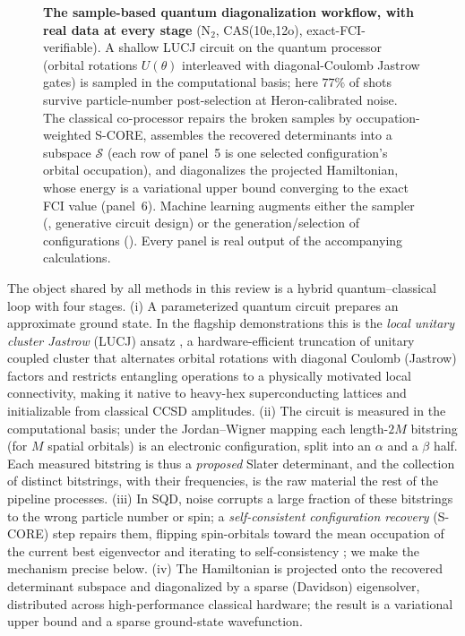 \documentclass[11pt]{article}
\newcommand{\ent}[1]{\raisebox{0.1ex}{\textcircled{\scriptsize #1}}}
\begin{document}
\begin{figure}[tb]
\caption{\textbf{The sample-based quantum diagonalization workflow, with real data at every stage} (N$_2$, CAS(10e,12o), exact-FCI-verifiable). A shallow LUCJ circuit on the quantum processor (orbital rotations $U(\theta)$ interleaved with diagonal-Coulomb Jastrow gates) is sampled in the computational basis; here $77\%$ of shots survive particle-number post-selection at Heron-calibrated noise. The classical co-processor repairs the broken samples by occupation-weighted S-CORE, assembles the recovered determinants into a subspace $\mathcal{S}$ (each row of panel~5 is one selected configuration's orbital occupation), and diagonalizes the projected Hamiltonian, whose energy is a variational upper bound converging to the exact FCI value (panel~6). Machine learning augments either the sampler (\ent{1}, generative circuit design) or the generation/selection of configurations (\ent{2}). Every panel is real output of the accompanying calculations.}
\label{fig:loop}
\end{figure}

The object shared by all methods in this review is a hybrid quantum--classical loop with four stages. (i) A parameterized quantum circuit prepares an approximate ground state. In the flagship demonstrations this is the \emph{local unitary cluster Jastrow} (LUCJ) ansatz \cite{motta2023}, a hardware-efficient truncation of unitary coupled cluster that alternates orbital rotations with diagonal Coulomb (Jastrow) factors and restricts entangling operations to a physically motivated local connectivity, making it native to heavy-hex superconducting lattices and initializable from classical CCSD amplitudes. (ii) The circuit is measured in the computational basis; under the Jordan--Wigner mapping each length-$2M$ bitstring (for $M$ spatial orbitals) is an electronic configuration, split into an $\alpha$ and a $\beta$ half. Each measured bitstring is thus a \emph{proposed} Slater determinant, and the collection of distinct bitstrings, with their frequencies, is the raw material the rest of the pipeline processes. (iii) In SQD, noise corrupts a large fraction of these bitstrings to the wrong particle number or spin; a \emph{self-consistent configuration recovery} (S-CORE) step repairs them, flipping spin-orbitals toward the mean occupation of the current best eigenvector and iterating to self-consistency \cite{robledomoreno2025}; we make the mechanism precise below. (iv) The Hamiltonian is projected onto the recovered determinant subspace and diagonalized by a sparse (Davidson) eigensolver, distributed across high-performance classical hardware; the result is a variational upper bound and a sparse ground-state wavefunction.
\end{document}
